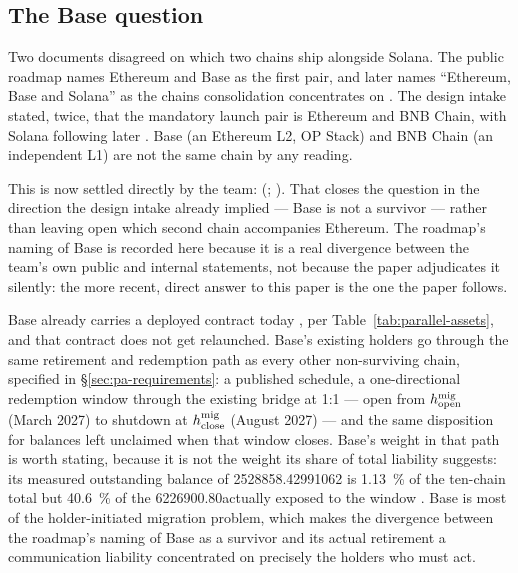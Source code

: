\subsection{The Base question}
\label{sec:pa-base}

Two documents disagreed on which two chains ship alongside Solana. The public roadmap names Ethereum
and Base as the first pair, and later names ``Ethereum, Base and Solana'' as the chains consolidation
concentrates on . The design intake stated, twice, that the
mandatory launch pair is Ethereum and BNB Chain, with Solana following later
. Base (an Ethereum L2, OP Stack) and BNB Chain (an independent L1)
are not the same chain by any reading.

This is now settled directly by the team:  (\planned; ). That closes the question in the
direction the design intake already implied — Base is not a survivor — rather than leaving open which
second chain accompanies Ethereum. The roadmap's naming of Base is recorded here because it is a real
divergence between the team's own public and internal statements, not because the paper adjudicates it
silently: the more recent, direct answer to this paper is the one the paper follows.

Base already carries a deployed \flux contract today \shipped
{}, per Table~\ref{tab:parallel-assets}, and that contract
does not get relaunched. Base's existing holders go through the same retirement and redemption path as
every other non-surviving chain, specified in \S\ref{sec:pa-requirements}: a published schedule, a
one-directional redemption window through the existing bridge at 1:1 --- open from $h^{\mathrm{mig}}_{\mathrm{open}}$ (March
2027) to shutdown at $h^{\mathrm{mig}}_{\mathrm{close}}$ (August 2027) --- and the same disposition for balances left unclaimed
when that window closes. Base's weight in that path is worth
stating, because it is not the weight its share of total liability suggests: its measured outstanding
balance of \num{2528858.42991062}\flux \shipped
{} is \SI{1.13}{\percent} of the ten-chain
total but \SI{40.6}{\percent} of the \num{6226900.80}\flux actually exposed to the window
\srcinferred. Base is most of the holder-initiated migration problem, which makes the divergence
between the roadmap's naming of Base as a survivor and its actual retirement a communication
liability concentrated on precisely the holders who must act.

